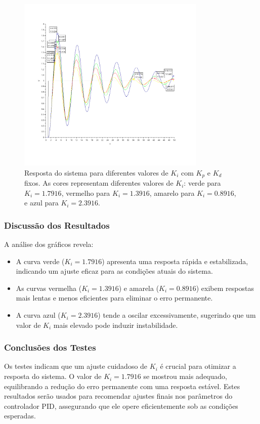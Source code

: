 \begin{figure}[H]
    \centering
    \includegraphics[width=0.8\textwidth]{6-atividade/assets/pid-ajustando-ki.png}
    \caption{Resposta do sistema para diferentes valores de \( K_i \) com \( K_p \) e \( K_d \) fixos. As cores representam diferentes valores de \( K_i \): verde para \( K_i = 1.7916 \), vermelho para \( K_i = 1.3916 \), amarelo para \( K_i = 0.8916 \), e azul para \( K_i = 2.3916 \).}
    \label{fig:response-various-ki}
\end{figure}

\subsubsection{Discussão dos Resultados}
A análise dos gráficos revela:
\begin{itemize}
    \item A curva verde (\( K_i = 1.7916 \)) apresenta uma resposta rápida e estabilizada, indicando um ajuste eficaz para as condições atuais do sistema.
    \item As curvas vermelha (\( K_i = 1.3916 \)) e amarela (\( K_i = 0.8916 \)) exibem respostas mais lentas e menos eficientes para eliminar o erro permanente.
    \item A curva azul (\( K_i = 2.3916 \)) tende a oscilar excessivamente, sugerindo que um valor de \( K_i \) mais elevado pode induzir instabilidade.
\end{itemize}

\subsubsection{Conclusões dos Testes}
Os testes indicam que um ajuste cuidadoso de \( K_i \) é crucial para otimizar a resposta do sistema. O valor de \( K_i = 1.7916 \) se mostrou mais adequado, equilibrando a redução do erro permanente com uma resposta estável. Estes resultados serão usados para recomendar ajustes finais nos parâmetros do controlador PID, assegurando que ele opere eficientemente sob as condições esperadas.

